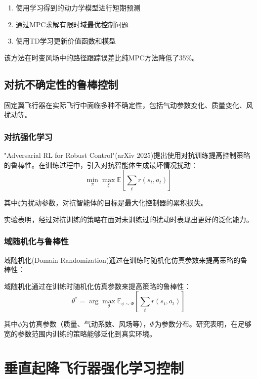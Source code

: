 \documentclass[12pt,a4paper]{ctexart}
\begin{document}
\begin{enumerate}
    \item 使用学习得到的动力学模型进行短期预测
    \item 通过MPC求解有限时域最优控制问题
    \item 使用TD学习更新价值函数和模型
\end{enumerate}

该方法在时变风场中的路径跟踪误差比纯MPC方法降低了35\%。

\subsection{对抗不确定性的鲁棒控制}

固定翼飞行器在实际飞行中面临多种不确定性，包括气动参数变化、质量变化、风扰动等。

\subsubsection{对抗强化学习}

"Adversarial RL for Robust Control"(arXiv 2025)提出使用对抗训练提高控制策略的鲁棒性。在训练过程中，引入对抗智能体生成最坏情况扰动：
\begin{equation}
    \min_{\pi} \max_{\xi} \mathbb{E}\left[\sum_t r(s_t, a_t)\right]
\end{equation}

其中$\xi$为扰动参数，对抗智能体的目标是最大化控制器的累积损失。

实验表明，经过对抗训练的策略在面对未训练过的扰动时表现出更好的泛化能力。

\subsubsection{域随机化与鲁棒性}

域随机化(Domain Randomization)通过在训练时随机化仿真参数来提高策略的鲁棒性：
\

域随机化通过在训练时随机化仿真参数来提高策略的鲁棒性：
\begin{equation}
    \theta^* = \arg\max_\theta \mathbb{E}_{\phi \sim \Phi}\left[\sum_t r(s_t, a_t)\right]
\end{equation}

其中$\phi$为仿真参数（质量、气动系数、风场等），$\Phi$为参数分布。研究表明，在足够宽的参数范围内训练的策略能够泛化到真实环境。

\section{垂直起降飞行器强化学习控制}\label{sec:vtol}
\end{document}
